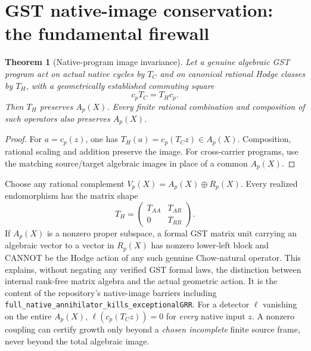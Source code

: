 \documentclass[11pt,a4paper]{article}
\newtheorem{theorem}{Theorem}[section]
\begin{document}
\section{GST native-image conservation: the fundamental firewall}
\begin{theorem}[Native-program image invariance]\label{th:native}
Let a genuine algebraic GST program act on actual native cycles
by \(T_C\) and on canonical rational Hodge classes by \(T_H\),
with a geometrically established commuting square
\[
                 c_p T_C=T_Hc_p. \tag{2.1}
\]
Then \(T_H\) preserves \(A_p(X)\).  Every finite rational combination
and composition of such operators also preserves \(A_p(X)\).
\end{theorem}
\begin{proof}
For \(a=c_p(z)\), one has \(T_H(a)=c_p(T_Cz)\in A_p(X)\).
Composition, rational scaling and addition preserve the image.
For cross-carrier programs, use the matching source/target
algebraic images in place of a common \(A_p(X)\).
\end{proof}
Choose any rational complement \(V_p(X)=A_p(X)\oplus R_p(X)\).
Every realized endomorphism has the matrix shape
\[
 T_H=\begin{pmatrix}T_{AA}&T_{AR}\\0&T_{RR}\end{pmatrix}.
 \tag{2.2}\label{eq:block}
\]
If \(A_p(X)\) is a nonzero proper subspace, a formal GST
matrix unit carrying an algebraic vector to a vector in \(R_p(X)\)
has nonzero lower-left block and CANNOT be the Hodge action
of any such genuine Chow-natural operator.  This explains,
without negating any verified GST formal laws, the distinction
between internal rank-free matrix algebra and the actual
geometric action.  It is the content of the repository's
native-image barriers including
\texttt{full\_native\_annihilator\_kills\_exceptionalGRR}.
For a detector \(\ell\) vanishing on the entire \(A_p(X)\),
\(\ell(c_p(T_Cz))=0\) for \emph{every} native input \(z\).
A nonzero coupling can certify growth only beyond a
\emph{chosen incomplete} finite source frame, never beyond
the total algebraic image.
\end{document}
